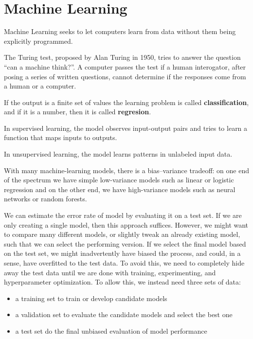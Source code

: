 \chapter{Machine Learning}

Machine Learning seeks to let computers learn from data
without them being explicitly programmed.


The Turing test, proposed by Alan Turing in 1950,
tries to answer the question \enquote{can a machine think?}.
A computer passes the test if a human interogator,
after posing a series of written questions,
cannot determine if the responses come from a human or a computer.



If the output is a finite set of values
the learning problem is called \textbf{classification},
and if it is a number, then it is called \textbf{regresion}.

In supervised learning, the model observes input-output pairs
and tries to learn a function that maps inputs to outputs.

In unsupervised learning, the model learns patterns in unlabeled input data.

With many machine-learning models, there is a bias--variance tradeoff:
on one end of the spectrum we have simple low-variance models 
such as linear or logistic regression
and on the other end, we have high-variance models
such as neural networks or random forests.

We can estimate the error rate of model
by evaluating it on a test set.
If we are only creating a single model,
then this approach suffices. 
However, we might want to compare many different models,
or slightly tweak an already existing model,
such that we can select the performing version.
If we select the final model based on the test set,
we might inadvertently have biased the process,
and could, in a sense, have overfitted to the test data.
To avoid this, we need to completely hide away the test data
until we are done with training, experimenting, 
and hyperparameter optimization.
To allow this, we instead need three sets of data:

\begin{itemize}
    \item a training set to train or develop candidate models
    \item a validation set to evaluate the candidate models
        and select the best one
    \item a test set do the final unbiased evaluation of model performance
\end{itemize}


